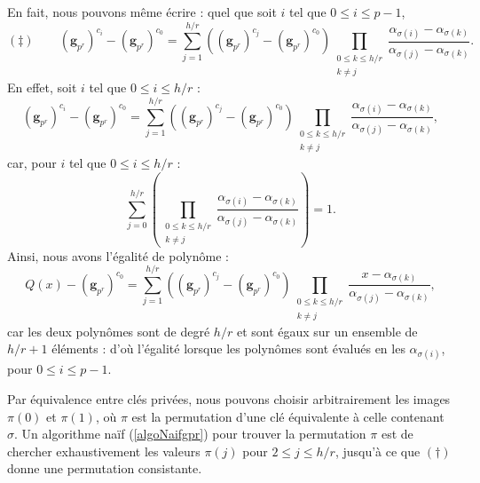 \documentclass[a4paper, titlepage, 11pt]{article}
\theoremstyle{definition}
\theoremstyle{remark}
\def\mbf#1{\mathbf{#1}}
\begin{document}
En fait, nous pouvons même écrire : quel que soit $i$ tel que $0\leqslant i \leqslant p-1$,
$$(\ddagger) \qquad (\mbf g_{p^r})^{c_i} - (\mbf g_{p^r})^{c_{0}} = \sum_{j=1}^{h/r} \left((\mbf g_{p^r})^{c_{j}} - (\mbf g_{p^r})^{c_{0}} \right)\prod_{\substack{0\leqslant k\leqslant h/r \\ k \neq j}} \frac{\alpha_{\sigma(i)}-\alpha_{\sigma(k)}}{\alpha_{\sigma(j)}-\alpha_{\sigma(k)}}.$$
En effet, soit $i$ tel que $0 \leqslant i \leqslant {h/r}$ :
$$(\mbf g_{p^r})^{c_i} - (\mbf g_{p^r})^{c_{0}} = \sum_{j=1}^{h/r} \left((\mbf g_{p^r})^{c_{j}} - (\mbf g_{p^r})^{c_{0}} \right)\prod_{\substack{0\leqslant k\leqslant h/r \\ k \neq j}} \frac{\alpha_{\sigma(i)}-\alpha_{\sigma(k)}}{\alpha_{\sigma(j)}-\alpha_{\sigma(k)}},$$
car, pour $i$ tel que $0 \leqslant i \leqslant {h/r}$ : $$\sum_{j=0}^{h/r} \left(\prod_{\substack{0\leqslant k\leqslant h/r \\ k \neq j}} \frac{\alpha_{\sigma(i)}-\alpha_{\sigma(k)}}{\alpha_{\sigma(j)}-\alpha_{\sigma(k)}}\right) = 1.$$
Ainsi, nous avons l'égalité de polynôme :
$$Q(x) - (\mbf g_{p^r})^{c_{0}} = \sum_{j=1}^{h/r} \left((\mbf g_{p^r})^{c_{j}} - (\mbf g_{p^r})^{c_{0}} \right)\prod_{\substack{0\leqslant k\leqslant h/r \\ k \neq j}} \frac{x-\alpha_{\sigma(k)}}{\alpha_{\sigma(j)}-\alpha_{\sigma(k)}},$$
car les deux polynômes sont de degré $h/r$ et sont égaux sur un ensemble de $h/r + 1$ éléments : d'où l'égalité lorsque les polynômes sont évalués en les $\alpha_{\sigma(i)}$, pour $0\leqslant i \leqslant p-1$.

Par équivalence entre clés privées, nous pouvons choisir arbitrairement les images $\pi(0)$ et $\pi(1)$, où $\pi$ est la permutation d'une clé équivalente à celle contenant $\sigma$. Un algorithme naïf (\ref{algoNaifgpr}) pour trouver la permutation $\pi$ est de chercher exhaustivement les valeurs $\pi(j)$ pour $2\leqslant j \leqslant h/r$, jusqu'à ce que $(\dagger)$ donne une permutation consistante.
\end{document}
